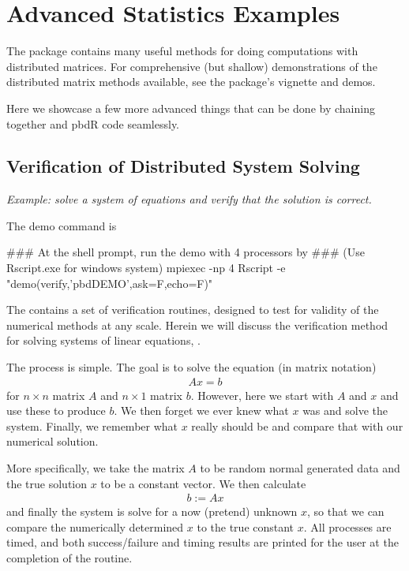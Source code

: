 \section{Advanced Statistics Examples}

The  package contains many useful methods for doing computations with distributed matrices.  For comprehensive (but shallow) demonstrations of the distributed matrix methods available, see the  package's vignette and demos.

Here we showcase a few more advanced things that can be done by chaining together  and pbdR code seamlessly.

\subsection{Verification of Distributed System Solving}

\emph{Example:  solve a system of equations and verify that the solution is correct.}

The demo command is
\begin{Command}
### At the shell prompt, run the demo with 4 processors by
### (Use Rscript.exe for windows system)
mpiexec -np 4 Rscript -e "demo(verify,'pbdDEMO',ask=F,echo=F)"
\end{Command}

The  contains a set of verification routines, designed to test for validity of the numerical methods at any scale.  Herein we will discuss the verification method for solving systems of linear equations, .

The process is simple.  The goal is to solve the equation (in matrix notation)
\begin{align*}
Ax=b
\end{align*}
for $n\times n$ matrix $A$ and $n\times 1$ matrix $b$.  However, here we start with $A$ and $x$ and use these to produce $b$.  We then forget we ever knew what $x$ was and solve the system.  Finally, we remember what $x$ really should be and compare that with our numerical solution.
  
More specifically, we take the matrix $A$ to be random normal generated data and the true solution $x$ to be a constant vector.  We then calculate
\begin{align*}
b := Ax
\end{align*}
and finally the system is solve for a now (pretend) unknown $x$, so that we can compare the numerically determined $x$ to the true constant $x$.  All processes are timed, and both success/failure and timing results are printed for the user at the completion of the routine. 

